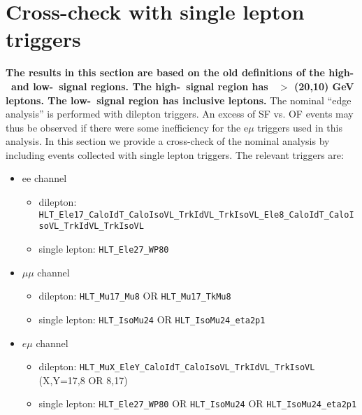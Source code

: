 \section{Cross-check with single lepton triggers}
\label{sec:triggers}

{\bf The results in this section are based on the old definitions of the high-\MET\ and low-\MET\ signal regions. The high-\MET\ signal region has \pt\ $>$ (20,10) GeV leptons. The low-\MET\ signal region has inclusive leptons.}
The nominal ``edge analysis'' is performed with dilepton triggers. An excess of SF vs. OF events may thus be observed if there
were some inefficiency for the e$\mu$ triggers used in this analysis. In this section we provide a cross-check of the nominal
analysis by including events collected with single lepton triggers. The relevant triggers are:

\begin{itemize}

\item ee channel
\begin{itemize}
\item dilepton: {\footnotesize \verb=HLT_Ele17_CaloIdT_CaloIsoVL_TrkIdVL_TrkIsoVL_Ele8_CaloIdT_CaloIsoVL_TrkIdVL_TrkIsoVL=}
\item single lepton: \verb=HLT_Ele27_WP80=
\end{itemize}

\item $\mu\mu$ channel
\begin{itemize}
\item dilepton: \verb=HLT_Mu17_Mu8= OR \verb=HLT_Mu17_TkMu8=
\item single lepton: \verb=HLT_IsoMu24= OR \verb=HLT_IsoMu24_eta2p1=
\end{itemize}

\item $e\mu$ channel
\begin{itemize}
\item dilepton: \verb=HLT_MuX_EleY_CaloIdT_CaloIsoVL_TrkIdVL_TrkIsoVL= (X,Y=17,8 OR 8,17)
\item single lepton: \verb=HLT_Ele27_WP80= OR \verb=HLT_IsoMu24= OR \verb=HLT_IsoMu24_eta2p1=
\end{itemize}

\end{itemize}


